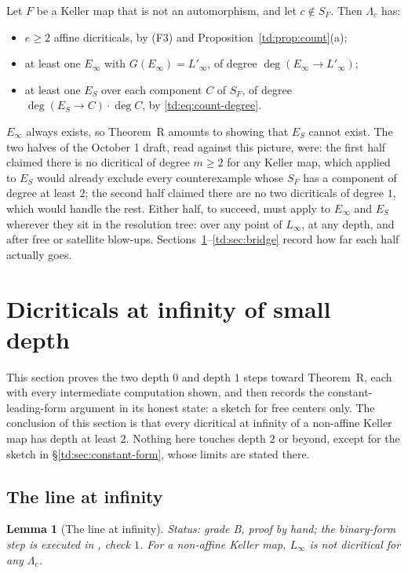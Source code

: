 \documentclass[a4paper,11pt]{article}
\newcommand{\filename}[1]{\texttt{\seqsplit{#1}}}
\theoremstyle{plain}
\newtheorem{lemma}[theorem]{Lemma}
\theoremstyle{definition}
\theoremstyle{remark}
\begin{document}
Let $F$ be a Keller map that is not an automorphism, and let $c \notin S_F$. Then
$\Lambda_c$ has:
\begin{itemize}[nosep]
\item $e \geq 2$ affine dicriticals, by (F3) and Proposition~\ref{td:prop:count}(a);
\item at least one $E_\infty$ with $G(E_\infty) = L'_\infty$, of degree
$\deg(E_\infty \to L'_\infty)$;
\item at least one $E_S$ over each component $C$ of $S_F$, of degree
$\deg(E_S \to C) \cdot \deg C$, by \eqref{td:eq:count-degree}.
\end{itemize}
$E_\infty$ always exists, so Theorem~R amounts to showing that $E_S$ cannot exist. The two
halves of the October 1 draft, read against this picture, were: the first half claimed there
is no dicritical of degree $m \geq 2$ for any Keller map, which applied to $E_S$ would
already exclude every counterexample whose $S_F$ has a component of degree at least $2$; the
second half claimed there are no two dicriticals of degree $1$, which would handle the rest.
Either half, to succeed, must apply to $E_\infty$ and $E_S$ wherever they sit in the
resolution tree: over any point of $L_\infty$, at any depth, and after free or satellite
blow-ups. Sections~\ref{td:sec:depth01}--\ref{td:sec:bridge} record how far each half actually goes.

\section{Dicriticals at infinity of small depth}\label{td:sec:depth01}

This section proves the two depth $0$ and depth $1$ steps toward Theorem~R, each with every
intermediate computation shown, and then records the constant-leading-form argument in its
honest state: a sketch for free centers only. The conclusion of this section is that every
dicritical at infinity of a non-affine Keller map has depth at least $2$. Nothing here touches
depth $2$ or beyond, except for the sketch in \S\ref{td:sec:constant-form}, whose limits are
stated there.

\subsection{The line at infinity}\label{td:sec:linf}

\begin{lemma}[The line at infinity]\label{td:lem:linf}
\textit{Status: grade B, proof by hand; the binary-form step is executed in
\filename{base\_point\_at\_infinity\_check.py}, check $1$.}
For a non-affine Keller map, $L_\infty$ is not dicritical for any $\Lambda_c$.
\end{lemma}
\end{document}
